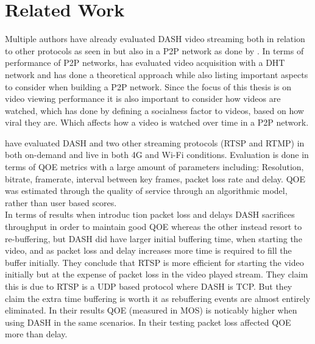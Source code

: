 \chapter{Related Work}

Multiple authors have already evaluated \acs{DASH} video streaming both in relation to other protocols as seen in \citeauthor{aloman2015performance} but also in a \acs{P2P} network as done by \citeauthor{gazdar2017toward}. In terms of performance of \acs{P2P} networks, \citeauthor{nguyen2009p2p} has evaluated video acquisition with a \acs{DHT} network and \citeauthor{qiu2004modeling} has done a theoretical approach while also listing important aspects to consider when building a \acs{P2P} network. Since the focus of this thesis is on video viewing performance it is also important to consider how videos are watched, which \citeauthor{broxton2013catching} has done by defining a socialness factor to videos, based on how viral they are. Which affects how a video is watched over time in a \acs{P2P} network.

\label{cha:related-work}
\citeauthor{aloman2015performance} \cite{aloman2015performance} have evaluated \acs{DASH} and two other streaming protocols (\acs{RTSP} and \acs{RTMP}) in both on-demand and live in both 4G and Wi-Fi conditions. Evaluation is done in terms of \ac{QOE} metrics with a large amount of parameters including: Resolution, bitrate, framerate, interval between key frames, packet loss rate and delay. \acs{QOE} was estimated through the quality of service through an algorithmic model, rather than user based scores.\\
In terms of results when introduc   tion packet loss and delays \acs{DASH} sacrifices throughput in order to maintain good \acs{QOE} whereas the other instead resort to re-buffering, but \acs{DASH} did have larger initial buffering time, when starting the video, and as packet loss and delay increases more time is required to fill the buffer initially. They conclude that \acs{RTSP} is more efficient for starting the video initially but at the expense of packet loss in the video played stream. They claim this is due to \acs{RTSP} is a UDP based protocol where \acs{DASH} is TCP. But they claim the extra time buffering is worth it as rebuffering events are almost entirely eliminated. In their results \acs{QOE} (measured in MOS) is noticably higher when using \acs{DASH} in the same scenarios. In their testing packet loss affected \acs{QOE} more than delay.




